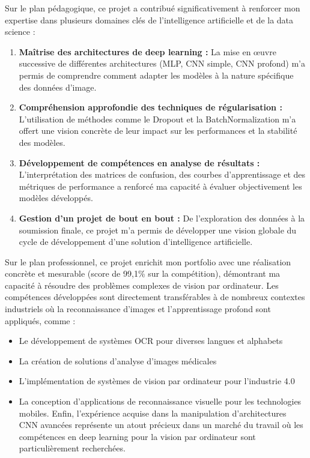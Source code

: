 \begin{flushleft}
Sur le plan pédagogique, ce projet a contribué significativement à renforcer mon expertise dans plusieurs domaines clés de l'intelligence artificielle et de la data science :
\bigskip
\begin{enumerate}
\item \textbf{Maîtrise des architectures de deep learning :}  La mise en œuvre successive de différentes architectures (MLP, CNN simple, CNN profond) m'a permis de comprendre comment adapter les modèles à la nature spécifique des données d'image.
\item \textbf{Compréhension approfondie des techniques de régularisation :} L'utilisation de méthodes comme le Dropout et la BatchNormalization m'a offert une vision concrète de leur impact sur les performances et la stabilité des modèles.
\item \textbf{Développement de compétences en analyse de résultats :} L'interprétation des matrices de confusion, des courbes d'apprentissage et des métriques de performance a renforcé ma capacité à évaluer objectivement les modèles développés.
\item \textbf{Gestion d'un projet de bout en bout :} De l'exploration des données à la soumission finale, ce projet m'a permis de développer une vision globale du cycle de développement d'une solution d'intelligence artificielle.
\end{enumerate}

Sur le plan professionnel, ce projet enrichit mon portfolio avec une réalisation concrète et mesurable (score de 99,1\% sur la compétition), démontrant ma capacité à résoudre des problèmes complexes de vision par ordinateur. Les compétences développées sont directement transférables à de nombreux contextes industriels où la reconnaissance d'images et l'apprentissage profond sont appliqués, comme :
\begin{itemize}
\item Le développement de systèmes OCR pour diverses langues et alphabets
\item La création de solutions d'analyse d'images médicales
\item L'implémentation de systèmes de vision par ordinateur pour l'industrie 4.0
\item La conception d'applications de reconnaissance visuelle pour les technologies mobiles.
\bigskip
Enfin, l'expérience acquise dans la manipulation d'architectures CNN avancées représente un atout précieux dans un marché du travail où les compétences en deep learning pour la vision par ordinateur sont particulièrement recherchées.
\end{itemize}
\end{flushleft}
